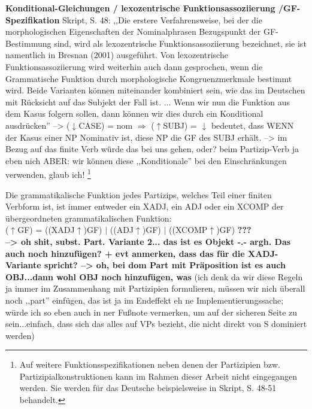 \documentclass[12pt,a4paper]{article}
\begin{document}
\textbf{Konditional-Gleichungen / lexozentrische Funktionsassoziierung /GF-Spezifikation} 
Skript, S. 48: ,,Die erstere Verfahrensweise, bei der die morphologischen Eigenschaften der Nominalphrasen Bezugspunkt der GF-Bestimmung sind, wird als lexozentrische Funktionsassoziierung bezeichnet, sie ist namentlich in Bresnan (2001) ausgeführt. Von lexozentrische Funktionsassoziierung wird weiterhin auch dann gesprochen, wenn die Grammatische Funktion durch morphologische Kongruenzmerkmale bestimmt wird. Beide Varianten können miteinander kombiniert sein, wie das im Deutschen mit Rücksicht auf das Subjekt der Fall ist. ... Wenn wir nun die Funktion aus dem
Kasus folgern sollen, dann können wir dies durch ein Konditional ausdrücken''
--> ($\downarrow$CASE) = nom $\Rightarrow$ ($\uparrow$SUBJ) = $\downarrow$ bedeutet, dass WENN der Kasus einer NP Nominativ ist, diese NP die GF des SUBJ erhält.
--> im Bezug auf das finite Verb würde das bei uns gehen, oder? beim Partizip-Verb ja eben nich
ABER: wir können diese ,,Konditionale'' bei den Einschränkungen verwenden, glaub ich!
\footnote{Auf weitere Funktionsspezifikationen neben denen der Partizipien bzw. Partizipialkonstruktionen kann im Rahmen dieser Arbeit nicht eingegangen werden. Sie werden für das Deutsche beispielsweise in Skript, S. 48-51 behandelt.}

Die grammatikalische Funktion jedes Partizips, welches Teil einer finiten Verbform ist, ist immer entweder ein XADJ, ein ADJ oder ein XCOMP der übergeordneten grammatikalischen Funktion: \\
($\uparrow$GF) = ((XADJ$\uparrow$)GF) $\mid$ ((ADJ$\uparrow$)GF) $\mid$ ((XCOMP$\uparrow$)GF) \textbf{???} \\ 
\textbf{--> oh shit, subst. Part. Variante 2... das ist es Objekt -.- argh. Das auch noch hinzufügen? + evt anmerken, dass das für die XADJ-Variante spricht? --> oh, bei dom Part mit Präposition ist es auch OBJ...dann wohl OBJ noch hinzufügen, was}
(ich denk da wir diese Regeln ja immer im Zusammenhang mit Partizipien formulieren, müssen wir nich überall noch ,,part'' einfügen, das ist ja im Endeffekt eh ne Implementierungssache; würde ich so eben auch in ner Fußnote vermerken, um auf der sicheren Seite zu sein...einfach, dass sich das alles auf VPs bezieht, die nicht direkt von S dominiert werden)
\end{document}
